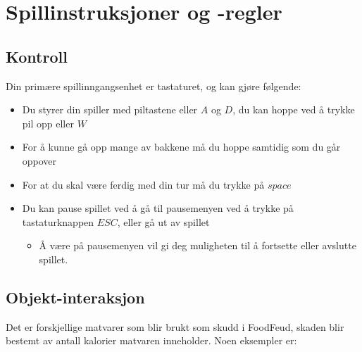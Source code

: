 \documentclass[paper=a4]{article}
\begin{document}
\section{Spillinstruksjoner og -regler}

\subsection{Kontroll}
Din primære spillinngangsenhet er tastaturet, og kan gjøre følgende:
\begin{itemize}
	\item{Du styrer din spiller med piltastene eller $A$ og $D$, du kan hoppe ved å trykke pil opp eller $W$}
	\item{For å kunne gå opp mange av bakkene må du hoppe samtidig som du går oppover}
	\item{For at du skal være ferdig med din tur må du trykke på $space$}
	\item{Du kan pause spillet ved å gå til pausemenyen ved å trykke på tastaturknappen $ESC$, eller gå ut av spillet}
	\begin{itemize}
		\item{Å være på pausemenyen vil gi deg muligheten til å fortsette eller avslutte spillet.}
	\end{itemize}
\end{itemize}

\subsection{Objekt-interaksjon}
Det er forskjellige matvarer som blir brukt som skudd i FoodFeud, skaden blir bestemt av antall kalorier matvaren inneholder. Noen eksempler er:
\end{document}
